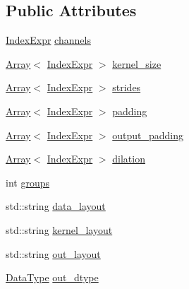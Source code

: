 \subsection*{Public Attributes}
\begin{DoxyCompactItemize}
\item 
\hyperlink{namespacetvm_1_1relay_ae153a27d81399fd266b8d598227764c4}{Index\+Expr} \hyperlink{structtvm_1_1relay_1_1Conv1DTransposeAttrs_ae1618e8e0d91676c32df3982484614ec}{channels}
\item 
\hyperlink{classtvm_1_1Array}{Array}$<$ \hyperlink{namespacetvm_1_1relay_ae153a27d81399fd266b8d598227764c4}{Index\+Expr} $>$ \hyperlink{structtvm_1_1relay_1_1Conv1DTransposeAttrs_abdd013a8a70fd5527468c79903925a60}{kernel\+\_\+size}
\item 
\hyperlink{classtvm_1_1Array}{Array}$<$ \hyperlink{namespacetvm_1_1relay_ae153a27d81399fd266b8d598227764c4}{Index\+Expr} $>$ \hyperlink{structtvm_1_1relay_1_1Conv1DTransposeAttrs_a82403cffafc3e9d4a8f42b7bf3aa6bc7}{strides}
\item 
\hyperlink{classtvm_1_1Array}{Array}$<$ \hyperlink{namespacetvm_1_1relay_ae153a27d81399fd266b8d598227764c4}{Index\+Expr} $>$ \hyperlink{structtvm_1_1relay_1_1Conv1DTransposeAttrs_af9d4b61cdac4dbce71fae171dee77fc2}{padding}
\item 
\hyperlink{classtvm_1_1Array}{Array}$<$ \hyperlink{namespacetvm_1_1relay_ae153a27d81399fd266b8d598227764c4}{Index\+Expr} $>$ \hyperlink{structtvm_1_1relay_1_1Conv1DTransposeAttrs_adda59958ed563345a7b55634a2d81131}{output\+\_\+padding}
\item 
\hyperlink{classtvm_1_1Array}{Array}$<$ \hyperlink{namespacetvm_1_1relay_ae153a27d81399fd266b8d598227764c4}{Index\+Expr} $>$ \hyperlink{structtvm_1_1relay_1_1Conv1DTransposeAttrs_ae87f13a6e8c813ff70863e8ea136fee4}{dilation}
\item 
int \hyperlink{structtvm_1_1relay_1_1Conv1DTransposeAttrs_ad305df36ad12c452c2e7a002abf3fbd8}{groups}
\item 
std\+::string \hyperlink{structtvm_1_1relay_1_1Conv1DTransposeAttrs_ad84a491c34314a7f22d3a628d717eb83}{data\+\_\+layout}
\item 
std\+::string \hyperlink{structtvm_1_1relay_1_1Conv1DTransposeAttrs_af6ad31ffe5b136be6f2c30eb277d3e33}{kernel\+\_\+layout}
\item 
std\+::string \hyperlink{structtvm_1_1relay_1_1Conv1DTransposeAttrs_a7d9be6d3a1cd41d1e72deef333ce558d}{out\+\_\+layout}
\item 
\hyperlink{namespacetvm_a41918af1a1dc386388639a9d3ad06c5d}{Data\+Type} \hyperlink{structtvm_1_1relay_1_1Conv1DTransposeAttrs_afea9635d53e2d659b62a1f651134fd73}{out\+\_\+dtype}
\end{DoxyCompactItemize}
